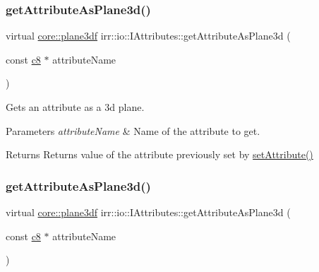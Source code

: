 \subsubsection{\texorpdfstring{get\+Attribute\+As\+Plane3d()}{getAttributeAsPlane3d()}\hspace{0.1cm}{\footnotesize\ttfamily [1/4]}}
{\footnotesize\ttfamily virtual \hyperlink{namespaceirr_1_1core_a97c9b39d4c6f71dbd9ded0153c4fa7f7}{core\+::plane3df} irr\+::io\+::\+I\+Attributes\+::get\+Attribute\+As\+Plane3d (\begin{DoxyParamCaption}\item[{const \hyperlink{namespaceirr_a9395eaea339bcb546b319e9c96bf7410}{c8} $\ast$}]{attribute\+Name }\end{DoxyParamCaption})\hspace{0.3cm}{\ttfamily [pure virtual]}}



Gets an attribute as a 3d plane. 


\begin{DoxyParams}{Parameters}
{\em attribute\+Name} & Name of the attribute to get. \\
\hline
\end{DoxyParams}
\begin{DoxyReturn}{Returns}
Returns value of the attribute previously set by \hyperlink{classirr_1_1io_1_1IAttributes_a03fa31acb481ae23678676cc183f09a6}{set\+Attribute()} 
\end{DoxyReturn}
\mbox{\label{classirr_1_1io_1_1IAttributes_a1d660e66f832cd670a47f5898bc0f5df}} 
\subsubsection{\texorpdfstring{get\+Attribute\+As\+Plane3d()}{getAttributeAsPlane3d()}\hspace{0.1cm}{\footnotesize\ttfamily [2/4]}}
{\footnotesize\ttfamily virtual \hyperlink{namespaceirr_1_1core_a97c9b39d4c6f71dbd9ded0153c4fa7f7}{core\+::plane3df} irr\+::io\+::\+I\+Attributes\+::get\+Attribute\+As\+Plane3d (\begin{DoxyParamCaption}\item[{const \hyperlink{namespaceirr_a9395eaea339bcb546b319e9c96bf7410}{c8} $\ast$}]{attribute\+Name }\end{DoxyParamCaption})\hspace{0.3cm}{\ttfamily [pure virtual]}}



